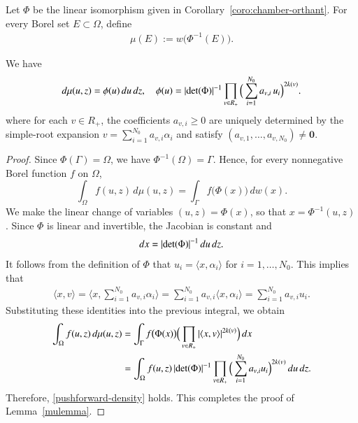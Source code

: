 \documentclass[12pt]{amsart}
\begin{document}
\begin{nota}
 Let $\Phi$ be the linear isomorphism given in Corollary~\ref{coro:chamber-orthant}. For every Borel set $E\subset\Omega$, define
\begin{align}\label{defmu}
  \mu(E):=w\big(\Phi^{-1}(E)\big).
\end{align}
\end{nota}
\begin{lemma}\label{mulemma}
We have
  \begin{equation}\label{pushforward-density}
d\mu(u,z)=\phi(u)\,du\,dz,\quad \phi(u)=|{\rm det}(\Phi)|^{-1}\prod_{v\in R_+}\Big(\sum_{i=1}^{N_{0}} a_{v,i}\,u_i\Big)^{2k(v)}.
\end{equation}
where for each $v\in R_+$, the coefficients $a_{v,i}\ge0$ are uniquely determined by the simple-root expansion
\(v=\sum_{i=1}^{N_0} a_{v,i}\alpha_i\) and satisfy $(a_{v,1},\dots,a_{v,N_0})\neq\mathbf 0$.
\end{lemma}
\begin{proof}
Since $\Phi(\Gamma)=\Omega$, we have $\Phi^{-1}(\Omega)=\Gamma$. Hence, for every nonnegative Borel function
$f$ on $\Omega$,
\[
\int_{\Omega} f(u,z)\,d\mu(u,z)
=\int_{\Gamma} f\big(\Phi(x)\big)\,dw(x).
\]
We make the linear change of variables $(u,z)=\Phi(x)$, so that $x=\Phi^{-1}(u,z)$. Since $\Phi$ is linear and invertible, the Jacobian is constant and
\[
dx = |{\rm det}(\Phi)|^{-1}\,du\,dz.
\]
It follows from the definition of $\Phi$ that
$
u_i=\langle x,\alpha_i\rangle$ for $i=1,\dots,N_0.
$
This implies that
\begin{align}\label{changevariable}
\langle x,v\rangle
=\Big\langle x,\sum_{i=1}^{N_0} a_{v,i}\alpha_i\Big\rangle
=\sum_{i=1}^{N_0} a_{v,i}\langle x,\alpha_i\rangle
=\sum_{i=1}^{N_0} a_{v,i}u_i.
\end{align}
Substituting these identities into the previous integral, we obtain
\begin{align*}
\int_{\Omega} f(u,z)\,d\mu(u,z)
&=\int_{\Gamma} f\big(\Phi(x)\big)\Big(\prod_{v\in R_+}|\langle x,v\rangle|^{2k(v)}\Big)\,dx \\
&=\int_{\Omega} f(u,z)\,
|{\rm det}(\Phi)|^{-1}\prod_{v\in R_+}\Big(\sum_{i=1}^{N_0} a_{v,i}u_i\Big)^{2k(v)}\,du\,dz.
\end{align*}
Therefore, \eqref{pushforward-density} holds. This completes the proof of Lemma~\ref{mulemma}.
\end{proof}
\end{document}
